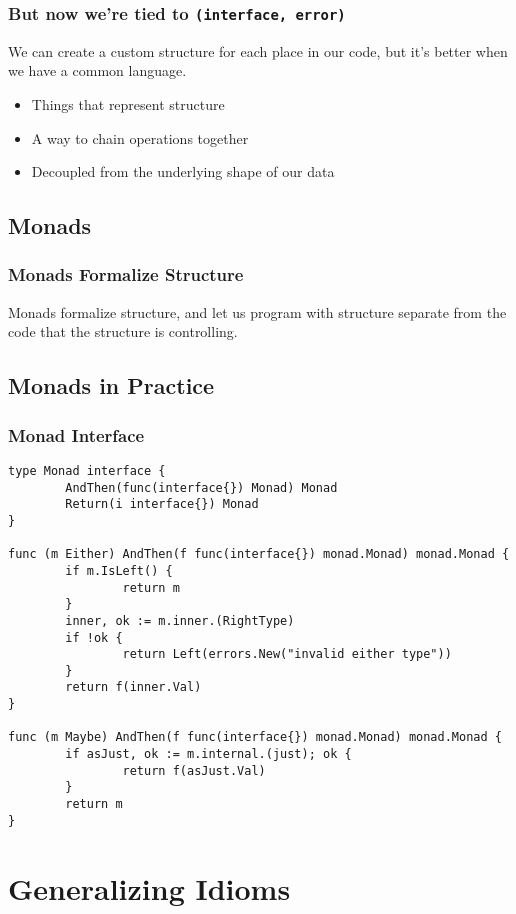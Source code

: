 \documentclass{beamer}
\begin{document}
\begin{frame}[fragile]
  \frametitle{But now we're tied to {\tt (interface{}, error)}}

  We can create a custom structure for each place in our code, but
  it's better when we have a common language.

  \begin{itemize}
  \item Things that represent structure
  \item A way to chain operations together
  \item Decoupled from the underlying shape of our data
  \end{itemize}
\end{frame}
\subsection{Monads}

\begin{frame}
  \frametitle{Monads Formalize Structure}

  Monads formalize structure, and let us program with structure
  separate from the code that the structure is controlling.
\end{frame}

\subsection{Monads in Practice}

\begin{frame}[fragile]
  \frametitle{Monad Interface}
\begin{lstlisting}
type Monad interface {
        AndThen(func(interface{}) Monad) Monad
        Return(i interface{}) Monad
}

func (m Either) AndThen(f func(interface{}) monad.Monad) monad.Monad {
        if m.IsLeft() {
                return m
        }
        inner, ok := m.inner.(RightType)
        if !ok {
                return Left(errors.New("invalid either type"))
        }
        return f(inner.Val)
}

func (m Maybe) AndThen(f func(interface{}) monad.Monad) monad.Monad {
        if asJust, ok := m.internal.(just); ok {
                return f(asJust.Val)
        }
        return m
}
\end{lstlisting}
\end{frame}
\section{Generalizing Idioms}
\end{document}
